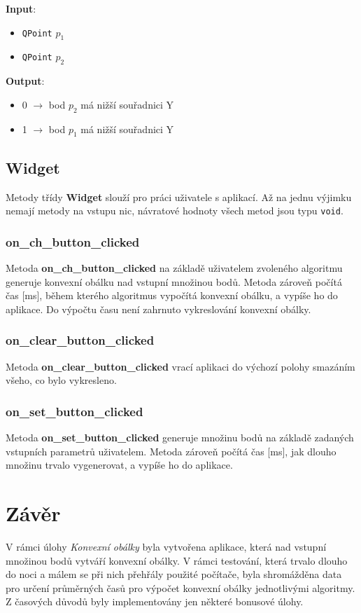 \documentclass[a4paper, 12pt]{article}
\begin{document}
\textbf{Input}:
\begin{itemize}
\item \texttt{QPoint} $p_1$
\item \texttt{QPoint} $p_2$
\end{itemize}

\textbf{Output}:
\begin{itemize}
\item 0 $\rightarrow$ bod $p_2$ má nižší souřadnici Y
\item 1 $\rightarrow$ bod $p_1$ má nižší souřadnici Y
\end{itemize}

\subsection{Widget}
Metody třídy \textbf{Widget} slouží pro práci uživatele s aplikací. Až na jednu výjimku nemají metody na vstupu nic, návratové hodnoty všech metod jsou typu \texttt{void}.

\subsubsection*{on\_ch\_button\_clicked}
Metoda \textbf{on\_ch\_button\_clicked} na základě uživatelem zvoleného algoritmu generuje konvexní obálku nad vstupní množinou bodů. Metoda zároveň počítá čas [ms], během kterého algoritmus vypočítá konvexní obálku, a vypíše ho do aplikace. Do výpočtu času není zahrnuto vykreslování konvexní obálky.

\subsubsection*{on\_clear\_button\_clicked}
Metoda \textbf{on\_clear\_button\_clicked} vrací aplikaci do výchozí polohy smazáním všeho, co bylo vykresleno. 

\subsubsection*{on\_set\_button\_clicked}
Metoda \textbf{on\_set\_button\_clicked} generuje množinu bodů na základě zadaných vstupních parametrů uživatelem. Metoda zároveň počítá čas [ms], jak dlouho množinu trvalo vygenerovat, a vypíše ho do aplikace.

\clearpage
\section{Závěr}
V rámci úlohy \textit{Konvexní obálky} byla vytvořena aplikace, která nad vstupní množinou bodů vytváří konvexní obálky. V rámci testování, která trvalo dlouho do noci a málem se při nich přehřály použité počítače, byla shromážděna data pro určení průměrných časů pro výpočet konvexní obálky jednotlivými algoritmy. Z časových důvodů byly implementovány jen některé bonusové úlohy.\\
\end{document}
